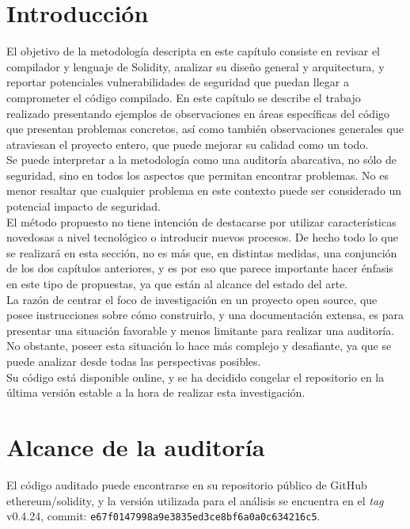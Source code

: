 \section{Introducción}

El objetivo de la metodología descripta en este capítulo consiste en revisar el compilador y lenguaje de Solidity, analizar su diseño general y arquitectura, y reportar potenciales vulnerabilidades de seguridad que puedan llegar a comprometer el código compilado. En este capítulo se describe el trabajo realizado presentando ejemplos de observaciones en áreas específicas del código que presentan problemas concretos, así como también observaciones generales que atraviesan el proyecto entero, que puede mejorar su calidad como un todo.\\

Se puede interpretar a la metodología como una auditoría abarcativa, no sólo de seguridad, sino en todos los aspectos que permitan encontrar problemas. No es menor resaltar que cualquier problema en este contexto puede ser considerado un potencial impacto de seguridad.\\

El método propuesto no tiene intención de destacarse por utilizar características novedosas a nivel tecnológico o introducir nuevos procesos. De hecho todo lo que se realizará en esta sección, no es más que, en distintas medidas, una conjunción de los dos capítulos anteriores, y es por eso que parece importante hacer énfasis en este tipo de propuestas, ya que están al alcance del estado del arte.\\

La razón de centrar el foco de investigación en un proyecto open source, que posee instrucciones sobre cómo construirlo, y una documentación extensa, es para presentar una situación favorable y menos limitante para realizar una auditoría. No obstante, poseer esta situación lo hace más complejo y desafiante, ya que se puede analizar desde todas las perspectivas posibles.\\

Su código está disponible online, y se ha decidido congelar el repositorio en la última versión estable a la hora de realizar esta investigación.


\section{Alcance de la auditoría}

El código auditado puede encontrarse en su repositorio público de GitHub ethereum/solidity\cite{SolidityGitHub}, y la versión utilizada para el análisis se encuentra en el \textit{tag} v0.4.24\cite{SolidityGitHub0424}, commit: \texttt{e67f0147998a9e3835ed3ce8bf6a0a0c634216c5}.\\

